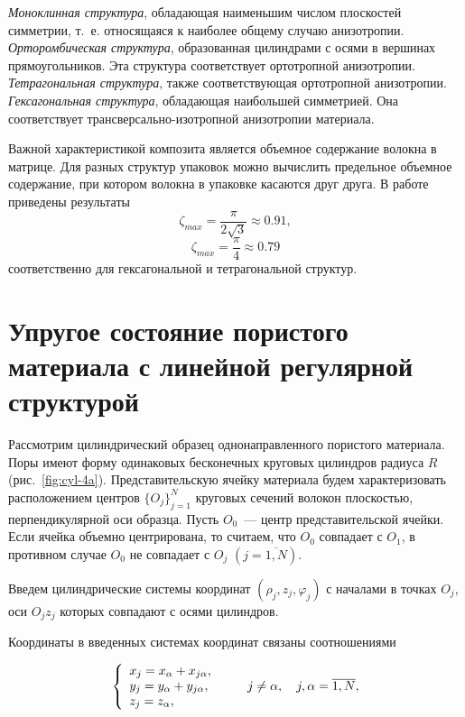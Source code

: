 \textit{Моноклинная структура}, обладающая наименьшим числом плоскостей симметрии, т.~е. относящаяся к наиболее общему случаю анизотропии. \textit{Орторомбическая структура}, образованная цилиндрами с осями в вершинах прямоугольников. Эта структура соответствует ортотропной анизотропии. \textit{Тетрагональная структура}, также соответствующая ортотропной анизотропии. \textit{Гексагональная структура}, обладающая наибольшей симметрией. Она соответствует трансверсально-изотропной анизотропии материала.

Важной характеристикой композита является объемное содержание волокна в матрице. Для разных структур упаковок можно вычислить предельное объемное содержание, при котором волокна в упаковке касаются друг друга. В работе~\cite{Vanin1985} приведены результаты
$$
\zeta_{max}=\frac{\pi}{2\sqrt{3}}\approx 0.91,
$$
$$
\zeta_{max}=\frac{\pi}{4}\approx 0.79
$$
соответственно для гексагональной и тетрагональной структур.

\section{Упругое состояние пористого материала с линейной регулярной структурой}

Рассмотрим цилиндрический образец однонаправленного пористого материала. Поры имеют форму одинаковых бесконечных круговых цилиндров радиуса $R$ (рис.~\ref{fig:cyl-4a}). Представительскую ячейку материала будем характеризовать расположением центров $\{O_j\}_{j=1}^N$ круговых сечений волокон плоскостью, перпендикулярной оси образца. Пусть $O_0$~--- центр представительской ячейки. Если ячейка объемно центрирована, то считаем, что $O_0$ совпадает с $O_1$, в противном случае $O_0$ не совпадает с $O_j$ $(j=\overline{1,N})$.

Введем цилиндрические системы координат $\left( {{\rho _j},{z_j},{\varphi _j}} \right)$ с началами в точках $O_j$, оси $O_jz_j$ которых совпадают с осями цилиндров.

Координаты в введенных системах координат связаны соотношениями

\begin{equation}
\left\{ {\begin{array}{*{20}{l}}
{{x_j} = {x_\alpha } + {x_{j\alpha }},}\\
{{y_j} = {y_\alpha } + {y_{j\alpha }},}\\
{{z_j} = {z_\alpha },}
\end{array}} \right.\qquad {\kern 1pt} j \ne \alpha ,\quad j,\alpha  = \overline {1,N},
\label{eq:7:25}
\end{equation}


